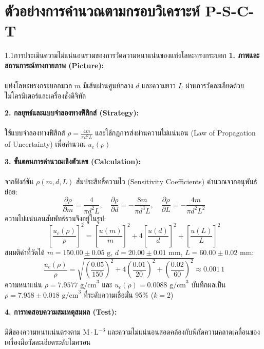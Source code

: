 \section{ตัวอย่างการคำนวณตามกรอบวิเคราะห์ P-S-C-T}

\begin{psctexample}{1.1}{การประเมินความไม่แน่นอนรวมของการวัดความหนาแน่นของแท่งโลหะทรงกระบอก}
\textbf{1. ภาพและสถานการณ์ทางกายภาพ (Picture):}\\\\ แท่งโลหะทรงกระบอกมวล $m$ มีเส้นผ่านศูนย์กลาง $d$ และความยาว $L$ ผ่านการวัดละเอียดด้วยไมโครมิเตอร์และเครื่องชั่งดิจิทัล

\vspace{4pt}
\textbf{2. กลยุทธ์และแบบจำลองทางฟิสิกส์ (Strategy):}\\\\ ใช้แบบจำลองทางฟิสิกส์ $\rho = \frac{4m}{\pi d^2 L}$ และใช้กฎการส่งผ่านความไม่แน่นอน (Law of Propagation of Uncertainty) เพื่อคำนวณ $u_c(\rho)$

\vspace{4pt}
\textbf{3. ขั้นตอนการคำนวณเชิงตัวเลข (Calculation):}\\\\ จากฟังก์ชัน $\rho(m, d, L)$ สัมประสิทธิ์ความไว (Sensitivity Coefficients) คำนวณจากอนุพันธ์ย่อย:
\begin{equation}
\frac{\partial \rho}{\partial m} = \frac{4}{\pi d^2 L}, \quad \frac{\partial \rho}{\partial d} = -\frac{8m}{\pi d^3 L}, \quad \frac{\partial \rho}{\partial L} = -\frac{4m}{\pi d^2 L^2}
\end{equation}
ความไม่แน่นอนสัมพัทธ์รวมจึงอยู่ในรูป:
\begin{equation}
\left[\frac{u_c(\rho)}{\rho}\right]^2 = \left[\frac{u(m)}{m}\right]^2 + 4\left[\frac{u(d)}{d}\right]^2 + \left[\frac{u(L)}{L}\right]^2
\end{equation}
สมมติค่าที่วัดได้ $m = 150.00 \pm 0.05\text{ g}$, $d = 20.00 \pm 0.01\text{ mm}$, $L = 60.00 \pm 0.02\text{ mm}$:
\begin{equation}
\frac{u_c(\rho)}{\rho} = \sqrt{\left(\frac{0.05}{150}\right)^2 + 4\left(\frac{0.01}{20}\right)^2 + \left(\frac{0.02}{60}\right)^2} \approx 0.001\,1
\end{equation}
ความหนาแน่น $\rho = 7.9577\text{ g/cm}^3$ และ $u_c(\rho) = 0.0088\text{ g/cm}^3$ บันทึกผลเป็น $\rho = 7.958 \pm 0.018\text{ g/cm}^3$ ที่ระดับความเชื่อมั่น 95\% ($k=2$)

\vspace{4pt}
\textbf{4. การทดสอบความสมเหตุสมผล (Test):}\\\\ มิติของความหนาแน่นตรงตาม $\text{M}\cdot\text{L}^{-3}$ และความไม่แน่นอนสอดคล้องกับพิกัดความคลาดเคลื่อนของเครื่องมือวัดละเอียดระดับไมครอน
\end{psctexample}

